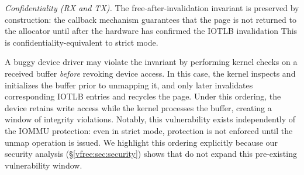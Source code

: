 \emph{Confidentiality (RX and TX).}
The free-after-invalidation invariant is preserved by construction: the callback mechanism guarantees that the page is not returned to the allocator until after the hardware has confirmed the IOTLB invalidation
This is confidentiality-equivalent to strict mode.
\fi




A buggy device driver may violate the invariant by performing kernel checks 
    on a received buffer \emph{before} revoking device access. 
In this case, the kernel inspects and initializes the buffer prior to unmapping it, 
    and only later invalidates corresponding IOTLB entries and recycles the page.
Under this ordering, the device retains write access while the kernel processes the buffer, 
    creating a window of integrity violations. 
Notably, this vulnerability exists independently of the IOMMU protection: 
    even in strict mode, protection is not enforced until the unmap operation is issued. 
We highlight this ordering explicitly because our security analysis (\S\ref{vfree:sec:security}) 
    shows that \brand{} do not expand this pre-existing vulnerability window.
\fi 